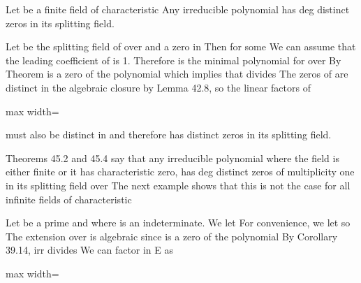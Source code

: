 \documentclass[11pt,oneside]{article}
\begin{document}
\begin{BookBody}
 Let  be a finite field of characteristic  Any irreducible polynomial  has  deg distinct zeros in its splitting field.

 Let  be the splitting field of  over  and \BookInline{\alpha } a zero  in  Then  for some  We can assume that the leading coefficient of  is 1. Therefore  is the minimal polynomial for \BookInline{\alpha } over  By Theorem  is a zero of the polynomial  which implies that  divides  The  zeros of  are distinct in the algebraic closure  by Lemma 42.8, so the linear factors of

\begin{center}\begin{adjustbox}{max width=\linewidth}\end{adjustbox}\end{center}

\noindent must also be distinct in  and therefore has  distinct zeros in its splitting field. \BookEnd{\blacklozenge}

Theorems 45.2 and 45.4 say that any irreducible polynomial  where the field  is either finite or it has characteristic zero, has deg distinct zeros of multiplicity one in its splitting field over  The next example shows that this is not the case for all infinite fields of characteristic 

 Let  be a prime and  where  is an indeterminate. We let  For convenience, we let  so  The extension  over  is algebraic since  is a zero of the polynomial  By Corollary 39.14, irr divides  We can factor  in E as

\begin{center}\begin{adjustbox}{max width=\linewidth}\end{adjustbox}\end{center}

\end{BookBody}
\end{document}
